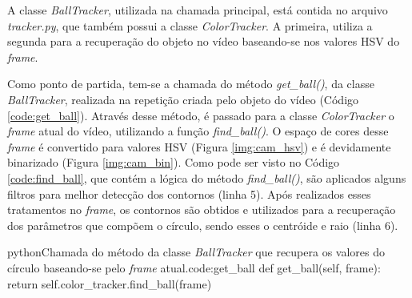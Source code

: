 A classe \textit{BallTracker}, utilizada na chamada principal, está contida no arquivo \textit{tracker.py}, que também possui a classe \textit{ColorTracker}. A primeira, utiliza a segunda para a recuperação do objeto no vídeo baseando-se nos valores HSV do \textit{frame}.

Como ponto de partida, tem-se a chamada do método \textit{get\_ball()}, da classe \textit{BallTracker}, realizada na repetição criada pelo objeto do vídeo (Código \ref{code:get_ball}). Através desse método, é passado para a classe \textit{ColorTracker} o \textit{frame} atual do vídeo, utilizando a  função \textit{find\_ball()}. O espaço de cores desse \textit{frame} é convertido para valores HSV (Figura \ref{img:cam_hsv}) e é devidamente binarizado (Figura \ref{img:cam_bin}). Como pode ser visto no Código \ref{code:find_ball}, que contém a lógica do método \textit{find\_ball()}, são aplicados alguns filtros para melhor detecção dos contornos (linha 5). Após realizados esses tratamentos no \textit{frame}, os contornos são obtidos e utilizados para a recuperação dos parâmetros que compõem o círculo, sendo esses o centróide e raio (linha 6).\newline

\begin{code}{python}{Chamada do método da classe \textit{BallTracker} que recupera os valores do círculo baseando-se pelo \textit{frame} atual.}{code:get_ball}
def get_ball(self, frame):
	return self.color_tracker.find_ball(frame)
\end{code}

